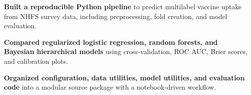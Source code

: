 \begin{bullets}
    \item \textbf{Built a reproducible Python pipeline} to predict multilabel vaccine uptake from NHFS survey data, including preprocessing, fold creation, and model evaluation.
    \item \textbf{Compared regularized logistic regression, random forests, and Bayesian hierarchical models} using cross-validation, ROC AUC, Brier scores, and calibration plots.
    \item \textbf{Organized configuration, data utilities, model utilities, and evaluation code} into a modular source package with a notebook-driven workflow.
\end{bullets}